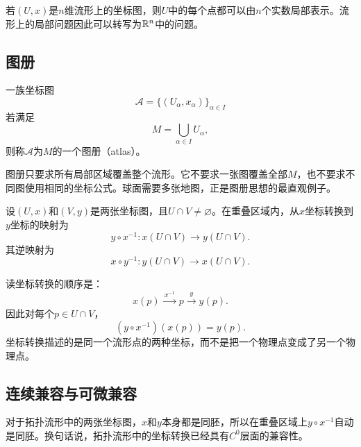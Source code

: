 \begin{proposition}[局部欧氏表示]
若$(U,x)$是$n$维流形上的坐标图，则$U$中的每个点都可以由$n$个实数局部表示。流形上的局部问题因此可以转写为$\mathbb{R}^n$中的问题。
\end{proposition}

\subsection{图册}

\begin{definition}[图册]
一族坐标图
\[
    \mathcal A=\{(U_\alpha,x_\alpha)\}_{\alpha\in I}
\]
若满足
\[
    M=\bigcup_{\alpha\in I}U_\alpha,
\]
则称$\mathcal A$为$M$的一个图册（atlas）。
\end{definition}

图册只要求所有局部区域覆盖整个流形。它不要求一张图覆盖全部$M$，也不要求不同图使用相同的坐标公式。球面需要多张地图，正是图册思想的最直观例子。

\begin{definition}[坐标转换]
设$(U,x)$和$(V,y)$是两张坐标图，且$U\cap V\neq\varnothing$。在重叠区域内，从$x$坐标转换到$y$坐标的映射为
\[
    y\circ x^{-1}:
    x(U\cap V)\longrightarrow y(U\cap V).
\]
其逆映射为
\[
    x\circ y^{-1}:
    y(U\cap V)\longrightarrow x(U\cap V).
\]
\end{definition}

读坐标转换的顺序是：
\[
    x(p)
    \xrightarrow{\ x^{-1}\ }p
    \xrightarrow{\ y\ }y(p).
\]
因此对每个$p\in U\cap V$，
\[
    (y\circ x^{-1})(x(p))=y(p).
\]
坐标转换描述的是同一个流形点的两种坐标，而不是把一个物理点变成了另一个物理点。

\begin{center}
\end{center}

\subsection{连续兼容与可微兼容}

对于拓扑流形中的两张坐标图，$x$和$y$本身都是同胚，所以在重叠区域上$y\circ x^{-1}$自动是同胚。换句话说，拓扑流形中的坐标转换已经具有$C^0$层面的兼容性。


